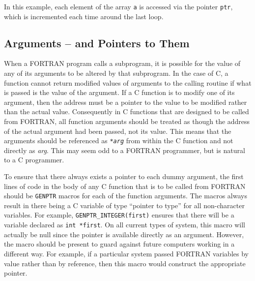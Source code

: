 \documentclass[twoside,11pt,nolof]{starlink}
\begin{document}
In this example, each element of the array \texttt{a} is accessed via the
pointer \texttt{ptr}, which is incremented each time around the last loop.

\subsection{Arguments -- and Pointers to Them}

When a FORTRAN program calls a subprogram, it is possible for the value of any
of its arguments to be altered by that subprogram. In the case of C, a function
cannot return modified values of arguments to the calling routine if what is
passed is the value of the argument. If a C function is to modify one of its
argument, then the address must be a pointer to the value to be modified rather
than the actual value. Consequently in C functions that are designed to be
called from FORTRAN, all function arguments should be treated as though the
address of the actual argument had been passed, not its value. This means that
the arguments should be referenced as \texttt{*\textit{arg}}\/ from within the C
function and not directly as \textit{arg}. This may seem odd to a FORTRAN
programmer, but is natural to a C programmer.

To ensure that there always exists a pointer to each dummy argument,
the first lines of code in the body of any C function that is to be called from
FORTRAN should be \texttt{GENPTR} macros for each of the function arguments.
The macros
always result in there being a C variable of type ``pointer to type'' for
all non-character variables.
For example, \texttt{GENPTR\_\-INTEGER(first)} ensures that there will be
a variable declared as \texttt{int *first}. On all current types of system,
this macro will actually be null since the pointer is available directly as an
argument. However, the macro should be present to guard against future
computers working in a different way. For example, if a particular system
passed FORTRAN variables by value rather than by reference, then this macro
would construct the appropriate pointer.
\end{document}
